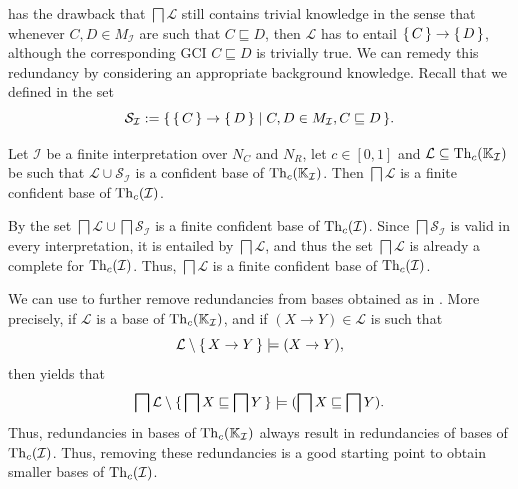  has the drawback
that $\bigsqcap \mathcal{L}$ still contains trivial knowledge in the sense that whenever
$C, D \in M_{\mathcal{I}}$ are such that $C \sqsubseteq D$, then $\mathcal{L}$ has to
entail ${\{\, C \,\}} \to {\ensuremath{\{\, D \,\}}}$, although the corresponding GCI $C \sqsubseteq D$ is
trivially true.  We can remedy this redundancy by considering an appropriate background
knowledge.  Recall that we defined in  the set
\begin{equation*}
  \mathcal{S}_{\mathcal{I}} := {\{\, {\{\, C \,\}} \to {\ensuremath{\{\, D \,\}}} \mid C, D \in
    M_{\mathcal{I}}, C \sqsubseteq D \,\}}.
\end{equation*}

\begin{Corollary}
  \label{cor:using-background-knowledge-for-confident-bases}
  Let $\mathcal{I}$ be a finite interpretation over $N_C$ and $N_R$, let $c \in [0,1]$ and
  $\mathcal{L} \subseteq \operatorname{Th}_c({\mathbb{K}}_{\mathcal{I}})$ be such that $\mathcal{L} \cup
  \mathcal{S}_{\mathcal{I}}$ is a confident base of $\operatorname{Th}_c({\mathbb{K}}_{\mathcal{I}})$.  Then
  $\bigsqcap \mathcal{L}$ is a finite confident base of $\operatorname{Th}_c(\mathcal{I})$.
\end{Corollary}
\begin{Proof}
  By  the set
  $\bigsqcap \mathcal{L} \cup \bigsqcap \mathcal{S}_{\mathcal{I}}$ is a finite confident
  base of $\operatorname{Th}_c(\mathcal{I})$.  Since $\bigsqcap \mathcal{S}_{\mathcal{I}}$ is valid in
  every interpretation, it is entailed by $\bigsqcap \mathcal{L}$, and thus the set
  $\bigsqcap \mathcal{L}$ is already a complete for $\operatorname{Th}_c(\mathcal{I})$.  Thus,
  $\bigsqcap \mathcal{L}$ is a finite confident base of $\operatorname{Th}_c(\mathcal{I})$.
\end{Proof}

We can use  to further remove
redundancies from bases obtained as in
.  More precisely,
if $\mathcal{L}$ is a base of $\operatorname{Th}_c({\mathbb{K}}_{\mathcal{I}})$, and if $(X \to Y) \in
\mathcal{L}$ is such that
\begin{equation*}
  \mathcal{L} \setminus {\ensuremath{\{\, X \to Y \,\}}} \models (X \to Y),
\end{equation*}
then  yields that
\begin{equation*}
  \bigsqcap \mathcal{L} \setminus {\ensuremath{\{\, \bigsqcap X \sqsubseteq \bigsqcap Y \,\}}} \models (
  \bigsqcap X \sqsubseteq \bigsqcap Y).
\end{equation*}
Thus, redundancies in bases of $\operatorname{Th}_c({\mathbb{K}}_{\mathcal{I}})$ always result in redundancies
of bases of $\operatorname{Th}_c(\mathcal{I})$.  Thus, removing these redundancies is a good starting
point to obtain smaller bases of $\operatorname{Th}_c(\mathcal{I})$.

